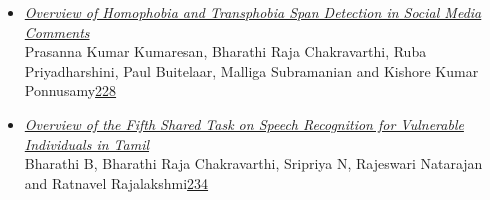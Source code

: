 \documentclass[11pt,oneside]{book}
\begin{document}
\begin{itemize}[leftmargin=*,label={}]
       \item \hyperlink{page.228}{\emph{Overview of Homophobia and Transphobia Span Detection in Social Media Comments}}\\ \hspace*{2em} Prasanna Kumar Kumaresan, Bharathi Raja Chakravarthi, Ruba Priyadharshini, Paul Buitelaar, Malliga Subramanian and Kishore Kumar Ponnusamy\dotfill \hyperlink{page.228}{228}
       \item \hyperlink{page.234}{\emph{Overview of the Fifth Shared Task on Speech Recognition for Vulnerable Individuals in Tamil}}\\ \hspace*{2em} Bharathi B, Bharathi Raja Chakravarthi, Sripriya N, Rajeswari Natarajan and Ratnavel Rajalakshmi\dotfill \hyperlink{page.234}{234}
  \end{itemize}
\newpage

\end{document}
